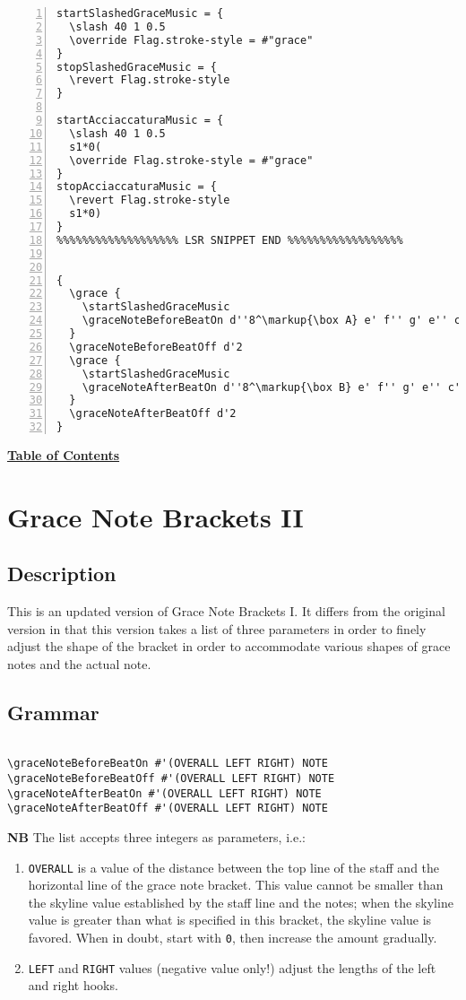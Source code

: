 \begin{Verbatim}[numbers=left,xleftmargin=5mm]
startSlashedGraceMusic = {
  \slash 40 1 0.5
  \override Flag.stroke-style = #"grace"
}
stopSlashedGraceMusic = {
  \revert Flag.stroke-style
}

startAcciaccaturaMusic = {
  \slash 40 1 0.5
  s1*0(
  \override Flag.stroke-style = #"grace"
}
stopAcciaccaturaMusic = {
  \revert Flag.stroke-style
  s1*0)
}
%%%%%%%%%%%%%%%%%%% LSR SNIPPET END %%%%%%%%%%%%%%%%%%


{
  \grace {
    \startSlashedGraceMusic
    \graceNoteBeforeBeatOn d''8^\markup{\box A} e' f'' g' e'' c'
  }
  \graceNoteBeforeBeatOff d'2
  \grace {
    \startSlashedGraceMusic
    \graceNoteAfterBeatOn d''8^\markup{\box B} e' f'' g' e'' c'
  }
  \graceNoteAfterBeatOff d'2
}
\end{Verbatim}

\hyperref[sec:toc]{\textbf{Table of Contents}}

\vfill \break


\section {Grace Note Brackets II}
\label{sec:gracenote2}
\hfill
{}
\hfill

\subsection{Description}
This is an updated version of Grace Note Brackets I. It differs from the original version in that this version takes a list of three parameters in order to finely adjust the shape of the bracket in order to accommodate various shapes of grace notes and the actual note. 

\subsection{Grammar}
\begin{verbatim}

\graceNoteBeforeBeatOn #'(OVERALL LEFT RIGHT) NOTE
\graceNoteBeforeBeatOff #'(OVERALL LEFT RIGHT) NOTE
\graceNoteAfterBeatOn #'(OVERALL LEFT RIGHT) NOTE
\graceNoteAfterBeatOff #'(OVERALL LEFT RIGHT) NOTE
\end{verbatim}
\textbf{NB}
The list accepts three integers as parameters, i.e.:
\begin{enumerate}
\item \verb|OVERALL| is a value of the distance between the top line of the staff and the horizontal line of the grace note bracket. This value cannot be smaller than the skyline value established by the staff line and the notes; when the skyline value is greater than what is specified in this bracket, the skyline value is favored. When in doubt, start with \verb|0|, then increase the amount gradually.
\item \verb|LEFT| and \verb|RIGHT| values (negative value only!)  adjust the lengths of the left and right hooks.   
\end{enumerate}
